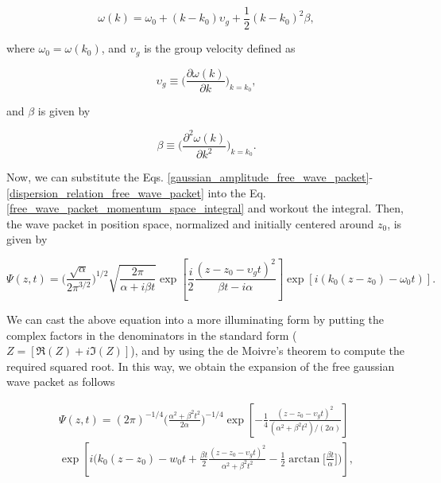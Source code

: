 \documentclass{article}
\begin{document}
\begin{equation}\label{dispersion_relation_free_wave_packet}
    \omega(k) = \omega_{0} + (k-k_{0})\upsilon_{g} + \frac{1}{2}(k-k_{0})^{2} \beta ,
\end{equation}

where $\omega_{0}=\omega(k_{0})$, and $\upsilon_{g}$ is the group velocity defined as

\begin{equation}
    \upsilon_{g} \equiv \bigg(\frac{\partial \omega(k)}{\partial k}\bigg)_{k=k_{0}},
\end{equation}

and $\beta$ is given by

\begin{equation}
    \beta \equiv \bigg(\frac{\partial^2 \omega(k)}{\partial k^2}\bigg)_{k=k_{0}}.
\end{equation}

Now, we can substitute the Eqs. \ref{gaussian_amplitude_free_wave_packet}-\ref{dispersion_relation_free_wave_packet} into the Eq. \ref{free_wave_packet_momentum_space_integral} and workout the integral. Then, the wave packet in position space, normalized and initially centered around $z_{0}$, is given by

\begin{equation}
    \Psi (z, t) = \bigg(\frac{\sqrt{\alpha}}{2 \pi ^{3/2}} \bigg)^{1/2} \sqrt{\frac{2 \pi}{\alpha + i \beta t}} \exp \left[{\frac{i}{2}\frac{(z - z_{0} - \upsilon_{g} t)^{2}}{\beta t - i \alpha}} \right]  \exp[{i (k_{0}(z-z_{0})-\omega_{0} t)}].
\end{equation}

We can cast the above equation into a more illuminating form by putting the complex factors in the denominators in the standard form ($Z = [\Re(Z)+i\Im(Z)]$), and by using the de Moivre's theorem to compute the required squared root. In this way, we obtain the expansion of the free gaussian wave packet as follows

\begin{multline}\label{free_wave_packet_position_space_centered_0} 
    \Psi (z, t) = (2\pi)^{-1/4} \bigg(\frac{\alpha^{2} + \beta^{2} t^{2}}{2\alpha}\bigg)^{-1/4} \exp \left[-\frac{1}{4} \frac{ (z - z_{0} - \upsilon_{g} t)^{2}}{(\alpha^{2} + \beta^{2}t^{2})/(2\alpha)}  \right] \\ \exp \left[i \bigg(k_{0}(z-z_{0}) - w_{0}t + \frac{\beta t}{2}\frac{(z - z_{0} - \upsilon_{g} t)^{2}}{\alpha^{2} + \beta^{2}t^{2}} - \frac{1}{2} \arctan\bigg[\frac{\beta t}{\alpha}\bigg]\bigg) \right],
\end{multline}
\end{document}
